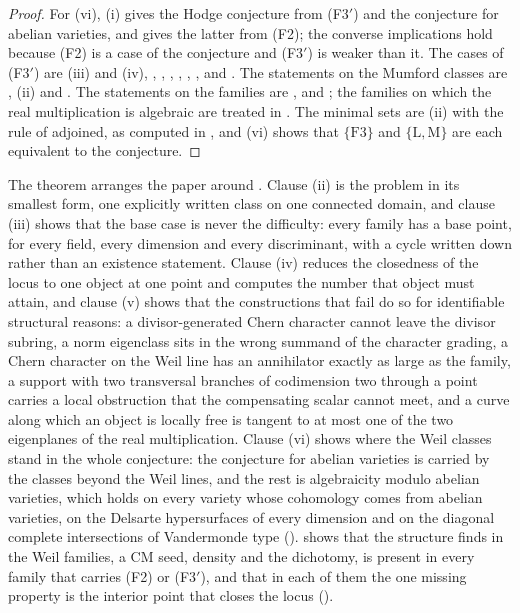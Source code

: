 \begin{proof}
For (vi), (i) gives the Hodge conjecture from
\textup{(F3$'$)} and the conjecture for abelian varieties, and
 gives the latter from \textup{(F2)}; the converse
implications hold because \textup{(F2)} is a case of the conjecture and
\textup{(F3$'$)} is weaker than it. The cases of \textup{(F3$'$)} are
(iii) and (iv), ,
, ,
, ,
,  and .
The statements on
the Mumford classes are , (ii) and
. The statements on the families are
,  and ; the
families on which the real multiplication is algebraic are treated in
\cite{BB26dense}. The
minimal sets are (ii) with
the rule of  adjoined, as computed in ,
and (vi) shows that $\{\mathrm{F3}\}$ and
$\{\mathrm{L},\mathrm{M}\}$ are each equivalent to the conjecture.
\end{proof}

The theorem arranges the paper around \cite[Theorem~1.1]{paperI}. Clause (ii) is the
problem in its smallest form, one explicitly written class on one connected
domain, and clause (iii) shows that the base case is never the difficulty:
every family has a base point, for every field, every dimension and every
discriminant, with a cycle written down rather than an existence statement.
Clause (iv) reduces the closedness of the locus to one object at one point
and computes the number that object must attain, and clause (v) shows that
the constructions that fail do so for identifiable structural reasons: a
divisor-generated Chern character cannot leave the divisor subring, a norm
eigenclass sits in the wrong summand of the character grading, a Chern
character on the Weil line has an annihilator exactly as large as the family,
a support with two transversal branches of codimension two through a point
carries a local obstruction that the compensating scalar cannot meet, and a curve along which an object is locally
free is tangent to at most one of the two eigenplanes of the real
multiplication. Clause (vi) shows where the Weil classes stand in the whole
conjecture: the conjecture for abelian varieties is carried by the classes
beyond the Weil lines, and the rest is algebraicity modulo abelian varieties,
which holds on every variety whose cohomology comes from abelian varieties,
on the Delsarte hypersurfaces of every dimension and on the diagonal
complete intersections of Vandermonde type ().
 shows that the structure \cite[Theorem~1.1]{paperI} finds in the
Weil families, a CM seed, density and the dichotomy, is present in every
family that carries (F2) or \textup{(F3$'$)}, and that in each of them the
one missing property is the interior point that closes the locus
().

